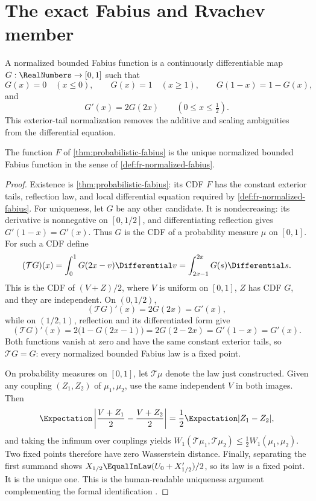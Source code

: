 \section{The exact Fabius and Rvachev member}
\label{sec:fr-fabius-member}

\begin{definition}
\label{def:fr-normalized-fabius}
A normalized bounded Fabius function is a continuously differentiable map
\(G:\RealNumbers\to[0,1]\) such that
\[
 G(x)=0\quad(x\le0),\qquad G(x)=1\quad(x\ge1),
 \qquad G(1-x)=1-G(x),
\]
and
\[
 G'(x)=2G(2x)\qquad(0\le x\le\tfrac12).
\]
This exterior-tail normalization removes the additive and scaling ambiguities
from the differential equation.
\end{definition}

\begin{theorem}
\label{thm:fr-fabius-identification}
The function \(F\) of \cref{thm:probabilistic-fabius} is the unique
normalized bounded Fabius function in the sense of
\cref{def:fr-normalized-fabius}.
\end{theorem}

\begin{proof}
Existence is \cref{thm:probabilistic-fabius}: its CDF \(F\) has the constant
exterior tails, reflection law, and local differential equation required by
\cref{def:fr-normalized-fabius}.  For uniqueness, let \(G\) be any other
candidate.  It is nondecreasing: its
derivative is nonnegative on \([0,1/2]\), and differentiating reflection gives
\(G'(1-x)=G'(x)\).  Thus \(G\) is the CDF of a probability measure \(\mu\)
on \([0,1]\).  For such a CDF define
\[
 (\mathcal TG)(x)=\int_0^1G(2x-v)\Differential v
 =\int_{2x-1}^{2x}G(s)\Differential s.
\]
This is the CDF of \((V+Z)/2\), where \(V\) is uniform on \([0,1]\),
\(Z\) has CDF \(G\), and they are independent.  On \((0,1/2)\),
\[
 (\mathcal TG)'(x)=2G(2x)=G'(x),
\]
while on \((1/2,1)\), reflection and its differentiated form give
\[
 (\mathcal TG)'(x)=2\bigl(1-G(2x-1)\bigr)
 =2G(2-2x)=G'(1-x)=G'(x).
\]
Both functions vanish at zero and have the same constant exterior tails, so
\(\mathcal TG=G\): every normalized bounded Fabius law is a fixed point.

On probability measures on \([0,1]\), let \(\mathcal T\mu\) denote the law
just constructed.  Given any coupling \((Z_1,Z_2)\) of \(\mu_1,\mu_2\), use
the same independent \(V\) in both images.  Then
\[
 \Expectation\left|\frac{V+Z_1}{2}-\frac{V+Z_2}{2}\right|
 =\frac12\Expectation|Z_1-Z_2|,
\]
and taking the infimum over couplings yields
\(W_1(\mathcal T\mu_1,\mathcal T\mu_2)
 \le\tfrac12W_1(\mu_1,\mu_2)\).  Two fixed points therefore have zero
Wasserstein distance.  Finally, separating the first summand shows
\(X_{1/2}\EqualInLaw(U_0+X_{1/2}')/2\), so its law is a fixed point.  It is
the unique one.  This is the human-readable uniqueness argument complementing
the formal identification
.
\end{proof}

